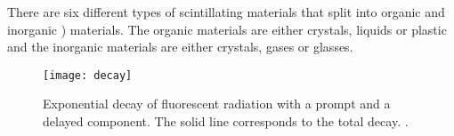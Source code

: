 There are six different types of scintillating materials that split into organic and inorganic ) materials. The organic materials are either crystals, liquids or plastic and the inorganic materials are either crystals, gases or glasses.
\begin{figure}[ht]
	\centering
	\texttt{[image: decay]}
	\caption{Exponential decay of fluorescent radiation with a prompt and a delayed component. The solid line corresponds to the total decay. \cite{leo}.}
	\label{pdecay}
\end{figure}\no
